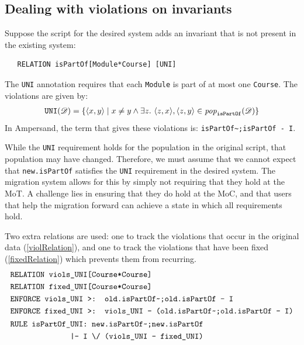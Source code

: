 \documentclass[runningheads]{llncs}
\newcommand{\id}[1]{\text{\it #1\/}}
\newcommand{\popF}[1]{\id{pop}_{#1}}
\newcommand{\pop}[2]{\popF{#1}(#2)}
\newcommand{\viol}[2]{{#1}(#2)}
\newcommand{\pair}[2]{\langle{#1},{#2}\rangle}
\newcommand{\dataset}{\mathscr{D}}
\begin{document}
   \subsection{Dealing with violations on invariants}
   Suppose the script for the desired system adds an invariant that is not present in the existing system:
   
   \begin{verbatim}
   RELATION isPartOf[Module*Course] [UNI]
   \end{verbatim}
   
   The \verb=UNI= annotation requires that each \verb=Module= is part of at most one \verb=Course=.
   The violations are given by:
   \begin{eqnarray}
   \viol{\tt UNI}{\dataset} = \{\pair{x}{y} \mid x \neq y \wedge \exists z.~ \pair{z}{x}, \pair{z}{y}\in\pop{\tt isPartOf}{\dataset} \}
   \end{eqnarray}
   In Ampersand, the term that gives these violations is: \verb=isPartOf~;isPartOf - I=.
   
   While the \verb=UNI= requirement holds for the population in the original script, that population may have changed.
   Therefore, we must assume that we cannot expect that \verb=new.isPartOf= satisfies the \verb=UNI= requirement in the desired system.
   The migration system allows for this by simply not requiring that they hold at the MoT.
   A challenge lies in ensuring that they do hold at the MoC, and that users that help the migration forward can achieve a state in which all requirements hold.
   
   Two extra relations are used: one to track the violations that occur in the original data (\ref{violRelation}), and one to track the violations that have been fixed (\ref{fixedRelation}) which prevents them from recurring.
   \begin{align}
   &\text{\tt RELATION viols\_UNI[Course*Course]}\label{violRelation}\\
   &\text{\tt RELATION fixed\_UNI[Course*Course]}\label{fixedRelation}\\
   &\text{\tt ENFORCE viols\_UNI >: old.isPartOf\textasciitilde;old.isPartOf - I}\label{fill viols}\\
   &\text{\tt ENFORCE fixed\_UNI >: viols\_UNI - (old.isPartOf\textasciitilde;old.isPartOf - I)}\label{fill fixed}\\
   &\begin{aligned}
   \text{\tt RULE isPartOf\_UNI: new.isPartOf\textasciitilde;new.isPartOf}\\
   \quad\text{\tt |- I \textbackslash/ (viols\_UNI - fixed\_UNI)}
   \end{aligned}\label{rule uni}
   \end{align}
   
\end{document}
